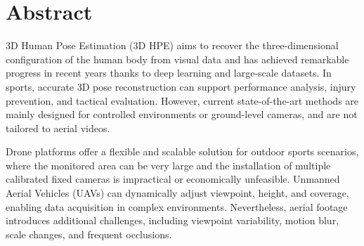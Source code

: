 \documentclass{Configuration_Files/PoliMi3i_thesis}
\begin{document}


\pagestyle{empty} %
\frontmatter %


\startpreamble
\setcounter{page}{1} %

\chapter*{Abstract} 
3D Human Pose Estimation (3D HPE) aims to recover the three-dimensional configuration of the human body from visual data and has achieved remarkable progress in recent years thanks to deep learning and large-scale datasets. In sports, 
accurate 3D pose reconstruction can support performance analysis, injury prevention, and tactical evaluation. However, current state-of-the-art methods are mainly designed for controlled environments or ground-level cameras, and are 
not tailored to aerial videos.

Drone platforms offer a flexible and scalable solution for outdoor sports scenarios, where the monitored area can be very large and the installation of multiple calibrated fixed cameras is impractical or economically unfeasible. 
Unmanned Aerial Vehicles (UAVs) can dynamically adjust viewpoint, height, and coverage, enabling data acquisition in complex environments. Nevertheless, aerial footage introduces additional challenges, including viewpoint variability, motion blur, scale changes, 
and frequent occlusions.
\end{document}
